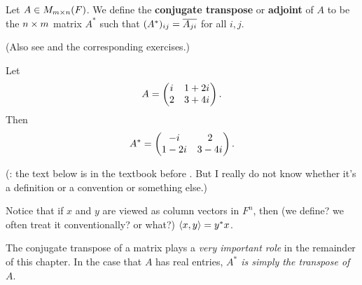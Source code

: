 \begin{definition} \label{def 6.2}
Let \(A \in M_{m \times n}(F)\).
We define the \textbf{conjugate transpose} or \textbf{adjoint} of \(A\) to be the \(n \times m\) matrix \(A^*\) such that \((A^*)_{ij} = \overline{A_{ji}}\) for all \(i, j\).

(Also see  and the corresponding exercises.)
\end{definition}

\begin{example} \label{example 6.1.4}
Let
\[
    A = \begin{pmatrix} {i\mkern1mu} & 1 + 2{i\mkern1mu} \\ 2 & 3 + 4{i\mkern1mu} \end{pmatrix}.
\]
Then
\[
    A^* = \begin{pmatrix} -{i\mkern1mu} & 2 \\ 1 - 2{i\mkern1mu} & 3 - 4{i\mkern1mu} \end{pmatrix}.
\]
\end{example}

\begin{remark} \label{remark 6.1.3}
(: the text below is in the textbook before .
But I really do not know whether it's a definition or a convention or something else.)

Notice that if \(x\) and \(y\) are viewed as column vectors in \(F^n\), then (we define? we often treat it conventionally? or what?) \(\left< x, y \right> = y^* x\).
\end{remark}

\begin{remark} \label{remark 6.1.4}
The conjugate transpose of a matrix plays a \emph{very important role} in the remainder of this chapter. In the case that \(A\) has real entries, \emph{\(A^*\) is simply the transpose of \(A\)}.
\end{remark}

